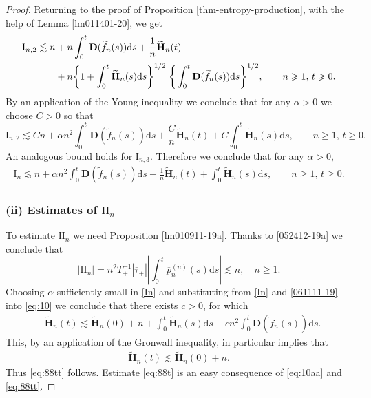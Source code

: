 \documentclass[EJP]{ejpecp} %
\newcommand\al{\alpha}
\renewcommand{\ge}{\geqslant}
\newcommand{\dd  }{\mathrm{d}}
\renewcommand{\tilde}{\widetilde}
\renewcommand{\bar}{\overline}
\numberwithin{equation}{section}
\begin{document}
\begin{proof}
Returning to the proof of Proposition \ref{thm-entropy-production},
with the help of Lemma \ref{lm011401-20}, we get 
\begin{align*}
\mathrm{I}_{n,2}\lesssim   n 
& +n\int_0^t \mathbf D(\tilde
f_n(s))\dd s+ \frac{1}{n}\tilde{\mathbf{H}}_n(t)\notag\\
&
+n\bigg\{1+\int_0^t\tilde{\mathbf{H}}_n(s)\dd s\bigg\}^{1/2}\; \bigg\{\int_0^t \mathbf D(\tilde f_n(s))\dd s\bigg\}^{1/2},\qquad n\ge 1,\,t\ge0.
\end{align*}
By an application of the Young inequality we conclude  that for any
$\al>0$ we choose $C>0$ so that
\begin{equation}
\label{In2a}
\mathrm{I}_{n,2}\lesssim  C n
+\al n^2\int_0^t \mathbf D(\tilde
f_n(s))\dd s+ \frac{C}{n}\tilde{\mathbf{H}}_n(t)
+C\int_0^t\tilde{\mathbf{H}}_n(s)\dd s,\qquad n\ge 1,\,t\ge0.
\end{equation}
An analogous bound holds for $\mathrm{I}_{n,3}$. Therefore we conclude that for
any $\al>0$,
\begin{align}
\label{In}
\mathrm{I}_{n}\lesssim n +\al n^2\int_0^t \mathbf D(\tilde
f_n(s))\dd s +\frac{1}{n}\tilde{\mathbf{H}}_n(t) +\int_0^t\tilde{\mathbf{H}}_n(s)\dd s,\qquad n\ge 1,\,t\ge0.
\end{align}






\subsubsection*{(ii) Estimates of $\mathrm{II}_n$}


To estimate $\mathrm{II}_n$  we need Proposition \ref{lm010911-19a}. Thanks to \eqref{052412-19a} we conclude that 
\begin{equation}
\label{061111-19}
|\mathrm{II}_n| =n^2 T_+^{-1} |\bar\tau_+|\left|\int_0^t\bar p_n ^{(n)} (s)\dd
  s\right|\lesssim n,\quad n\ge1.
\end{equation}
Choosing $\al$ sufficiently small in \eqref{In} and substituting
from \eqref{In} and \eqref{061111-19}  into \eqref{eq:10}
we conclude that there exists $c>0$, for which
\begin{align}
  \label{eq:10aa}
 & \tilde{\mathbf{H}}_n(t)\lesssim \tilde{\mathbf{H}}_n(0) +n+ \int_0^t
\tilde{\mathbf{H}}_n(s)\dd s
  - cn^2\int_0^t \mathbf D(\tilde f_n(s))\dd s. 
\end{align}
This, by an application of the Gronwall inequality, in particular implies that 
\begin{align}
  \label{eq:10b}
  \tilde{\mathbf{H}}_n(t)\lesssim \tilde{\mathbf{H}}_n(0) +n.
\end{align}
Thus \eqref{eq:88tt} follows. Estimate \eqref{eq:88t} is an easy
consequence of \eqref{eq:10aa} and  \eqref{eq:88tt}. 
\end{proof}
\end{document}
